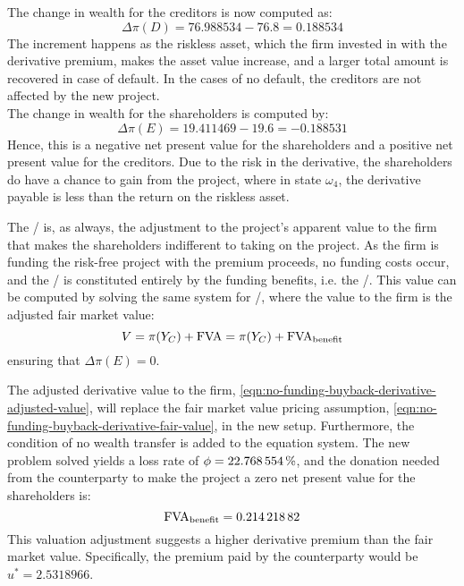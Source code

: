 \documentclass[../main.tex]{subfiles}
\begin{document}
            The change in wealth for the creditors is now computed as:
            \begin{equation}
                \Delta \pi(D) = \num{76.988534} - \num{76.8} = \num{0.188534}
            \end{equation}
            The increment happens as the riskless asset, which the firm invested in with the derivative premium, 
            makes the asset value increase, and a larger total amount is recovered in case of default. 
            In the cases of no default, the creditors are not affected by the new project.\\
            The change in wealth for the shareholders is computed by:
            \begin{equation}
                \Delta \pi(E) = \num{19.411469} - \num{19.6} = \num{-0.188531}
            \end{equation}
            Hence, this is a negative net present value for the shareholders 
            and a positive net present value for the creditors. 
            Due to the risk in the derivative, the shareholders do have a chance to gain from the project, 
            where in state $\omega_4$, the derivative payable is less than the return on the riskless asset.

            The \FVA/ is, as always, the adjustment to the project's apparent value to the firm that makes the shareholders indifferent to taking on the project.
            As the firm is funding the risk-free project with the premium proceeds, no funding costs occur, and the \FVA/ is constituted entirely by the funding benefits, i.e. the \FBA/. 
            This value can be computed by solving the same system for \FBA/, where the value to the firm is the adjusted fair market value:
            \begin{equation}
                V = \pi(Y_C) + \FVA/ = \pi(Y_C) + \FBA/
                \label{eqn:no-funding-buyback-derivative-adjusted-value}
            \end{equation}
            ensuring that $\Delta \pi(E) = 0$.

            The adjusted derivative value to the firm, \cref{eqn:no-funding-buyback-derivative-adjusted-value},
            will replace the fair market value pricing assumption, \cref{eqn:no-funding-buyback-derivative-fair-value}, in the new setup.
            Furthermore, the condition of no wealth transfer is added to the equation system.
            The new problem solved yields a loss rate of $\phi = \pct{0.22768554}$,
            and the donation needed from the counterparty to make the project a zero net present value for the shareholders is:
            \begin{equation}
                \FBA/ = \num{0.21421882}
            \end{equation}
            This valuation adjustment suggests a higher derivative premium than the fair market value. Specifically, the premium paid by the counterparty would be $u^{\ast} = \num{2.5318966}$.
\end{document}
